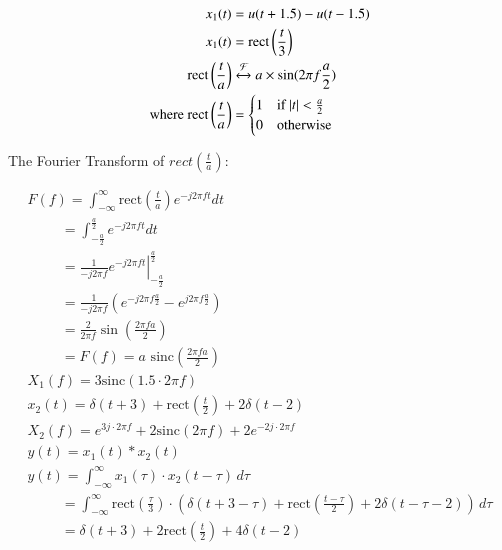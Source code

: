 \documentclass[journal,12pt,onecolumn]{IEEEtran}
\theoremstyle{remark}
\begin{document}
\begin{align}
x_1(t) &= u(t+1.5) - u(t-1.5) \\
x_1(t) &= \text{rect}\left(\frac{t}{3}\right) \\
\text{rect}\left(\frac{t}{a}\right) &\xleftrightarrow{\mathcal{F}} a \times \sin(2\pi f \frac{a}{2}) \\
\text{where } \text{rect}\left(\frac{t}{a}\right) &= \begin{cases}
1 & \text{if } |t| < \frac{a}{2} \\
0 & \text{otherwise}
\end{cases}
\end{align}


The Fourier Transform of $rect\left(\frac{t}{a}\right)$:

\begin{align}
& F(f) = \int_{-\infty}^{\infty} \text{rect}\left(\frac{t}{a}\right) e^{-j2\pi f t} dt \\
&\hspace{1cm}= \int_{-\frac{a}{2}}^{\frac{a}{2}} e^{-j2\pi f t} dt \\
&\hspace{1cm}= \left. \frac{1}{-j2\pi f} e^{-j2\pi f t} \right|_{-\frac{a}{2}}^{\frac{a}{2}} \\
&\hspace{1cm}= \frac{1}{-j2\pi f} (e^{-j2\pi f \frac{a}{2}} - e^{j2\pi f \frac{a}{2}}) \\
&\hspace{1cm}= \frac{2}{2\pi f} \sin\left(\frac{2\pi f a}{2}\right)\\
&\hspace{1cm}=\boxed{F(f) = a \text{ sinc}\left(\frac{2\pi f a}{2}\right)}\\
& X_1(f)=3\text{sinc}(1.5\cdot 2\pi f) & \\
& x_2(t) = \delta(t+3) + \text{rect}\left(\frac{t}{2}\right) + 2\delta(t-2) & \\
& X_2(f) = e^{3j\cdot 2\pi f} + 2\text{sinc}(2\pi f) + 2e^{-2j \cdot 2\pi f} & \\
& y(t) = x_1(t) * x_2(t) \\
& y(t) = \int_{-\infty}^{\infty} x_1(\tau) \cdot x_2(t - \tau) \, d\tau \\
&\hspace{1cm} =\int_{-\infty}^{\infty} \text{rect}\left(\frac{\tau}{3}\right) \cdot \left( \delta(t+3-\tau) + \text{rect}\left(\frac{t-\tau}{2}\right) + 2\delta(t-\tau-2) \right) \, d\tau \\
&\hspace{1cm}= \delta(t+3) + 2\text{rect}\left(\frac{t}{2}\right) + 4\delta(t-2)\\

\end{align}
\end{document}
